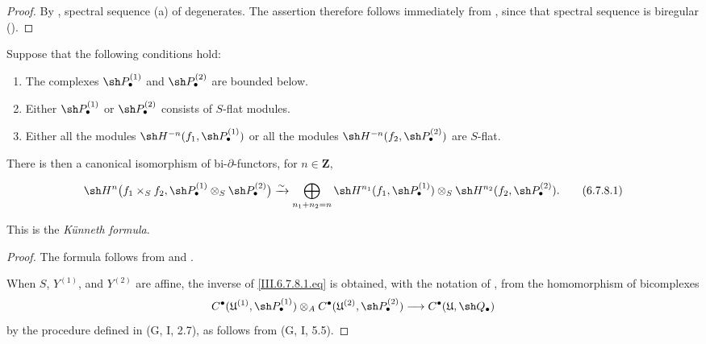 \begin{proof}
By , spectral sequence \textnormal{(a)} of
 degenerates.  The assertion therefore follows
immediately from , since that spectral sequence
is biregular ().
\end{proof}

\begin{theorem}[6.7.8]
\label{III.6.7.8}
Suppose that the following conditions hold:
\begin{enumerate}
  \item[{$1^\circ$}]
    The complexes $\sh P_\bullet^{(1)}$ and
    $\sh P_\bullet^{(2)}$ are bounded below.
  \item[{$2^\circ$}]
    Either $\sh P_\bullet^{(1)}$ or
    $\sh P_\bullet^{(2)}$ consists of $S$-flat modules.


  \item[{$3^\circ$}]
    Either all the modules
    $\sh H^{-n}(f_1,\sh P_\bullet^{(1)})$ or all the modules
    $\sh H^{-n}(f_2,\sh P_\bullet^{(2)})$ are $S$-flat.
\end{enumerate}
There is then a canonical isomorphism of bi-$\partial$-functors,
for $n\in\mathbf Z$,
\begin{env}[6.7.8.1]
\label{III.6.7.8.1}
\[
  \sh H^n
  \bigl(
    f_1\times_Sf_2,
    \sh P_\bullet^{(1)}\otimes_S\sh P_\bullet^{(2)}
  \bigr)
  \xrightarrow{\sim}
  \bigoplus_{n_1+n_2=n}
  \sh H^{n_1}(f_1,\sh P_\bullet^{(1)})
  \otimes_S
  \sh H^{n_2}(f_2,\sh P_\bullet^{(2)}).
  \tag{6.7.8.1}\label{III.6.7.8.1.eq}
\]
\end{env}
This is the \emph{K\"unneth formula}.
\end{theorem}

\begin{proof}
The formula follows from  and
.

When $S$, $Y^{(1)}$, and $Y^{(2)}$ are affine, the inverse of
\eqref{III.6.7.8.1.eq} is obtained, with the notation of
, from the homomorphism of bicomplexes
\[
  C^\bullet(\mathfrak U^{(1)},\sh P_\bullet^{(1)})
  \otimes_A
  C^\bullet(\mathfrak U^{(2)},\sh P_\bullet^{(2)})
  \longrightarrow
  C^\bullet(\mathfrak U,\sh Q_\bullet)
\]
by the procedure defined in \textnormal{(G, I, 2.7)}, as follows
from \textnormal{(G, I, 5.5)}.
\end{proof}

